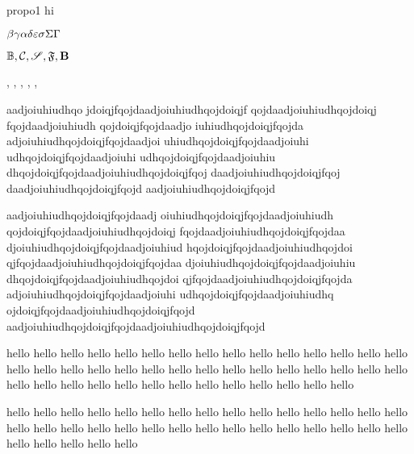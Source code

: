 \documentclass[12pt]{alittlebear}
\begin{document}
 

\begin{propo}{}{propo1}
    hi
\end{propo}


$\beta\gamma\alpha\delta\varepsilon\sigma\Sigma\Gamma$

$\mathbb{B},\mathcal{C},\mathscr{S},\mathfrak{F},\mathbf{B}$

, , , , , 

aadjoiuhiudhqo jdoiqjfqojdaadjoiuhiudhqojdoiqjf qojdaadjoiuhiudhqojdoiqj fqojdaadjoiuhiudh qojdoiqjfqojdaadjo iuhiudhqojdoiqjfqojda adjoiuhiudhqojdoiqjfqojdaadjoi uhiudhqojdoiqjfqojdaadjoiuhi udhqojdoiqjfqojdaadjoiuhi udhqojdoiqjfqojdaadjoiuhiu dhqojdoiqjfqojdaadjoiuhiudhqojdoiqjfqoj daadjoiuhiudhqojdoiqjfqoj daadjoiuhiudhqojdoiqjfqojd aadjoiuhiudhqojdoiqjfqojd

aadjoiuhiudhqojdoiqjfqojdaadj oiuhiudhqojdoiqjfqojdaadjoiuhiudh qojdoiqjfqojdaadjoiuhiudhqojdoiqj fqojdaadjoiuhiudhqojdoiqjfqojdaa djoiuhiudhqojdoiqjfqojdaadjoiuhiud hqojdoiqjfqojdaadjoiuhiudhqojdoi qjfqojdaadjoiuhiudhqojdoiqjfqojdaa djoiuhiudhqojdoiqjfqojdaadjoiuhiu dhqojdoiqjfqojdaadjoiuhiudhqojdoi qjfqojdaadjoiuhiudhqojdoiqjfqojda adjoiuhiudhqojdoiqjfqojdaadjoiuhi  udhqojdoiqjfqojdaadjoiuhiudhq ojdoiqjfqojdaadjoiuhiudhqojdoiqjfqojd aadjoiuhiudhqojdoiqjfqojdaadjoiuhiudhqojdoiqjfqojd

hello hello hello hello hello hello hello hello hello hello hello hello hello hello hello hello hello hello hello hello hello hello hello hello hello hello hello hello hello hello hello hello hello hello hello hello hello hello hello hello hello hello hello 

hello hello hello hello hello hello hello hello hello hello hello hello hello hello hello hello hello hello hello hello hello hello hello hello hello hello hello hello hello hello hello hello hello hello hello 
\end{document}
